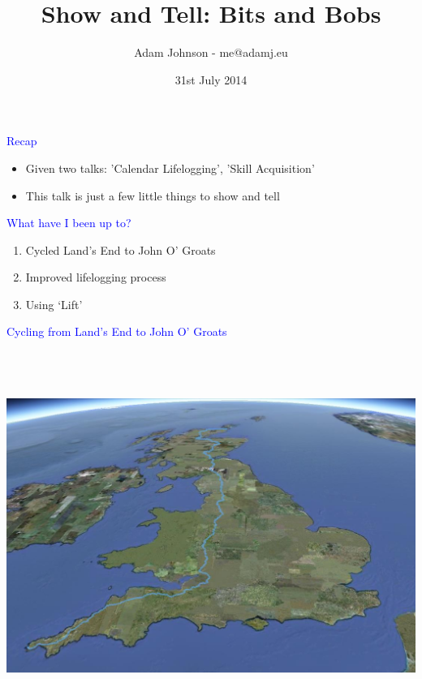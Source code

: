 \documentclass[landscape]{slides}
\title{Show and Tell: Bits and Bobs}
\author{Adam Johnson - me@adamj.eu}
\date{31st July 2014}
\begin{document}
\maketitle


\begin{slide}

    \textcolor{blue}{\Large{Recap}}

    \begin{itemize}
        \item Given two talks: 'Calendar Lifelogging', 'Skill Acquisition'
        \item This talk is just a few little things to show and tell
    \end{itemize}

\end{slide}


\begin{slide}

    \textcolor{blue}{\Large{What have I been up to?}}

    \begin{enumerate}
        \item Cycled Land's End to John O' Groats
        \item Improved lifelogging process
        \item Using `Lift'
    \end{enumerate}

\end{slide}




\begin{slide}

    \textcolor{blue}{\Large{Cycling from Land's End to John O' Groats}}

    \begin{center}
        \includegraphics[height=12cm]{lejog-earth}
    \end{center}

\end{slide}
\end{document}
